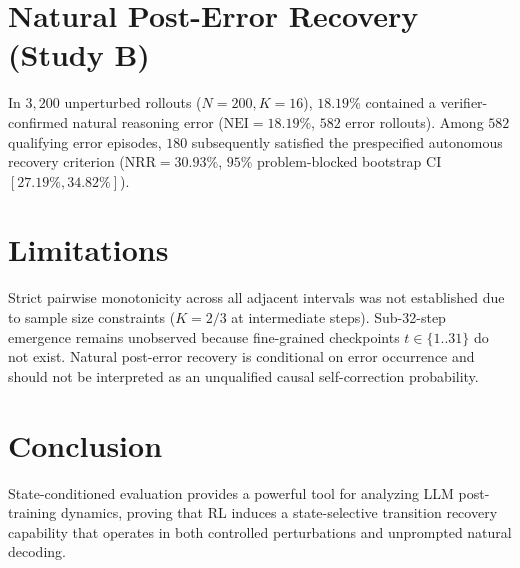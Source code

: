 \documentclass[11pt]{article}
\begin{document}
\section{Natural Post-Error Recovery (Study B)}
In $3,200$ unperturbed rollouts ($N=200, K=16$), $18.19\%$ contained a verifier-confirmed natural reasoning error ($\text{NEI} = 18.19\%$, $582$ error rollouts). Among $582$ qualifying error episodes, $180$ subsequently satisfied the prespecified autonomous recovery criterion ($\text{NRR} = \mathbf{30.93\%}$, $95\%$ problem-blocked bootstrap CI $[27.19\%, 34.82\%]$).

\section{Limitations}
Strict pairwise monotonicity across all adjacent intervals was not established due to sample size constraints ($K=2/3$ at intermediate steps). Sub-32-step emergence remains unobserved because fine-grained checkpoints $t \in \{1..31\}$ do not exist. Natural post-error recovery is conditional on error occurrence and should not be interpreted as an unqualified causal self-correction probability.

\section{Conclusion}
State-conditioned evaluation provides a powerful tool for analyzing LLM post-training dynamics, proving that RL induces a state-selective transition recovery capability that operates in both controlled perturbations and unprompted natural decoding.



\end{document}

